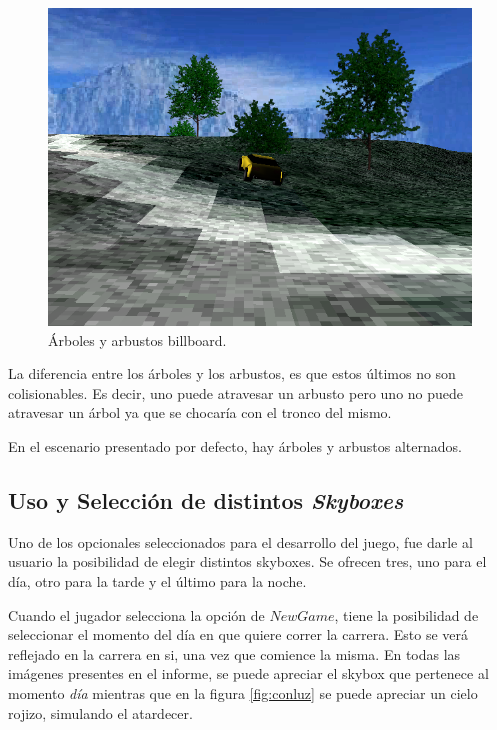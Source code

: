 \documentclass[a4paper,10pt]{article}
\begin{document}
\begin{figure}
 \centering
 \includegraphics[scale=0.4]{./billboard.png}
 \caption{\'Arboles y arbustos billboard.}
 \label{fig:figure7}
\end{figure}

La diferencia entre los \'arboles y los arbustos, es que estos \'ultimos no son
colisionables.  Es decir, uno puede atravesar un arbusto pero uno no
puede atravesar un \'arbol ya que se chocar\'ia con el tronco del mismo.

En el escenario presentado por defecto, hay \'arboles y arbustos alternados.

\subsection{Uso y Selecci\'on de distintos \textit{Skyboxes}}

Uno de los opcionales seleccionados para el desarrollo del juego, fue darle al
usuario la posibilidad de elegir distintos skyboxes.  Se ofrecen tres, uno para
el d\'ia, otro para la tarde y el \'ultimo para la noche.

Cuando el jugador selecciona la opci\'on de $New Game$, tiene la posibilidad de
seleccionar el momento del d\'ia en que quiere correr la carrera.  Esto se
ver\'a reflejado en la carrera en si, una vez que comience la misma.  En todas
las im\'agenes presentes en el informe, se puede apreciar el skybox que
pertenece al momento \textit{d\'ia} mientras que en la figura \ref{fig:conluz}
se puede apreciar un cielo rojizo, simulando el atardecer.
\end{document}
